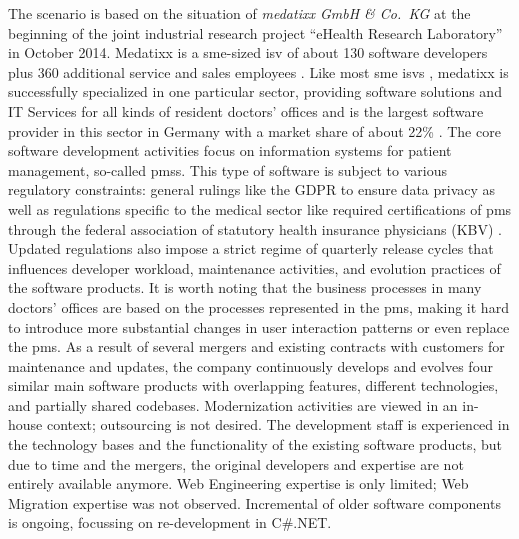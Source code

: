 The scenario is based on the situation of \emph{medatixx GmbH \& Co.~KG} at the beginning of the joint industrial research project ``eHealth Research Laboratory'' in October 2014.
Medatixx is a \gls{sme}-sized \gls{isv} of about 130 software developers plus 360 additional service and sales employees \autocite{Medatixx2018}.
Like most \gls{sme} \glspl{isv} \autocite{Rose2016InnovationSME}, medatixx is successfully specialized in one particular sector, providing software solutions and IT Services for all kinds of resident doctors' offices and is the largest software provider in this sector in Germany with a market share of about 22\% \autocite{Medatixx2018}.
The core software development activities focus on information systems for patient management, so-called \glspl{pms}.
This type of software is subject to various regulatory constraints: general rulings like the GDPR to ensure data privacy \autocite{GDPR2016} as well as regulations specific to the medical sector like required certifications of \gls{pms} through the federal association of statutory health insurance physicians (KBV) \autocite{KBV2018}.
Updated regulations also impose a strict regime of quarterly release cycles that influences developer workload, maintenance activities, and evolution practices of the software products.
It is worth noting that the business processes in many doctors' offices are based on the processes represented in the \gls{pms}, making it hard to introduce more substantial changes in user interaction patterns or even replace the \gls{pms}.
As a result of several mergers and existing contracts with customers for maintenance and updates, the company continuously develops and evolves four similar main software products with overlapping features, different technologies, and partially shared codebases.
Modernization activities are viewed in an in-house context; outsourcing is not desired.
The development staff is experienced in the technology bases and the functionality of the existing software products, but due to time and the mergers, the original developers and expertise are not entirely available anymore.
\gls{Web Engineering} expertise is only limited; \gls{Web Migration} expertise was not observed.
Incremental  of older software components is ongoing, focussing on re-development in C\#.NET.

